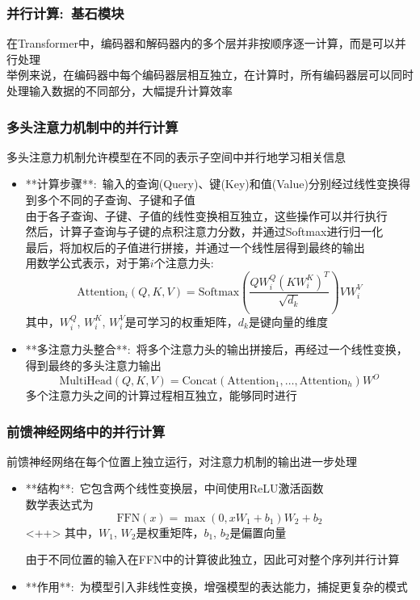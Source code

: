 \begin{frame}
    \frametitle{并行计算:~基石模块}
    在\textrm{Transformer}中，编码器和解码器内的多个层并非按顺序逐一计算，而是可以并行处理\\
    举例来说，在编码器中每个编码器层相互独立，在计算时，所有编码器层可以同时处理输入数据的不同部分，大幅提升计算效率
\end{frame}

\begin{frame}
    \frametitle{多头注意力机制中的并行计算}
    多头注意力机制允许模型在不同的表示子空间中并行地学习相关信息
    \begin{itemize}
	    \item **计算步骤**:~输入的查询\textrm{(Query)}、键\textrm{(Key)}和值\textrm{(Value)}分别经过线性变换得到多个不同的子查询、子键和子值\\
		    由于各子查询、子键、子值的线性变换相互独立，这些操作可以并行执行\\
		    然后，计算子查询与子键的点积注意力分数，并通过\textrm{Softmax}进行归一化\\
		    最后，将加权后的子值进行拼接，并通过一个线性层得到最终的输出\\

		    用数学公式表示，对于第$i$个注意力头:~
		    \begin{displaymath}
			    \text{Attention}_i(Q, K, V) = \text{Softmax}(\frac{Q W_i^Q (K W_i^K)^T}{\sqrt{d_k}}) V W_i^V 
		    \end{displaymath}
        其中，$W_i^Q$, $W_i^K$, $W_i^V$是可学习的权重矩阵，$d_k$是键向量的维度
        \item **多注意力头整合**:~将多个注意力头的输出拼接后，再经过一个线性变换，得到最终的多头注意力输出
		\begin{displaymath}
			\text{MultiHead}(Q, K, V) = \text{Concat}(\text{Attention}_1, \ldots, \text{Attention}_h) W^O
		\end{displaymath}
        多个注意力头之间的计算过程相互独立，能够同时进行
    \end{itemize}
\end{frame}

\begin{frame}
    \frametitle{前馈神经网络中的并行计算}
    前馈神经网络在每个位置上独立运行，对注意力机制的输出进一步处理
    \begin{itemize}
	    \item **结构**:~它包含两个线性变换层，中间使用\textrm{ReLU}激活函数\\
		    数学表达式为
		    \begin{displaymath}
			     \text{FFN}(x) = \max(0, x W_1 + b_1) W_2 + b_2 
		    \end{displaymath}<++>
        其中，$W_1$, $W_2$是权重矩阵，$b_1$, $b_2$是偏置向量

	由于不同位置的输入在\textrm{FFN}中的计算彼此独立，因此可对整个序列并行计算
        \item **作用**:~为模型引入非线性变换，增强模型的表达能力，捕捉更复杂的模式
    \end{itemize}
\end{frame}

